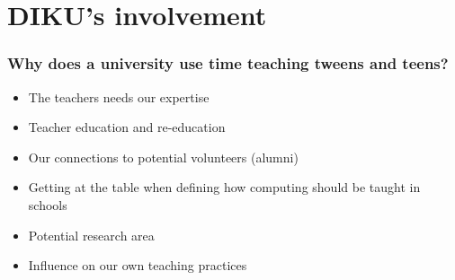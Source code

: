 \documentclass{beamer}
\begin{document}








\section{DIKU's involvement}
\begin{frame}
\frametitle{Why does a university use time teaching tweens and teens?}
\begin{itemize}
\item The teachers needs our expertise
\item Teacher education and re-education
\item Our connections to potential volunteers (alumni)
\item Getting at the table when defining how computing should be taught in schools
\item Potential research area
\item Influence on our own teaching practices
\end{itemize}
\end{frame}
\end{document}
